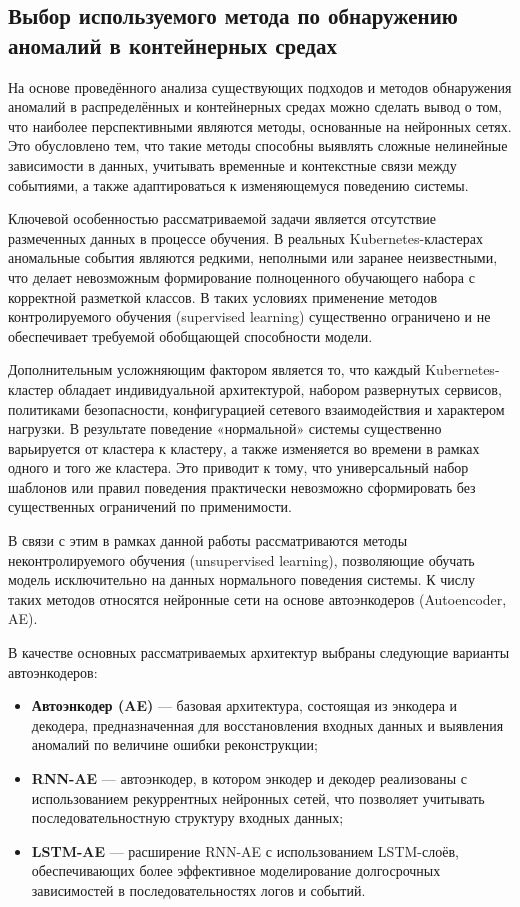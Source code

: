 \subsection{Выбор используемого метода по обнаружению аномалий в контейнерных средах}

На основе проведённого анализа существующих подходов и методов обнаружения аномалий в распределённых и контейнерных средах можно сделать вывод о том, что наиболее перспективными являются методы, основанные на нейронных сетях. Это обусловлено тем, что такие методы способны выявлять сложные нелинейные зависимости в данных, учитывать временные и контекстные связи между событиями, а также адаптироваться к изменяющемуся поведению системы.

Ключевой особенностью рассматриваемой задачи является отсутствие размеченных данных в процессе обучения. В реальных Kubernetes-кластерах аномальные события являются редкими, неполными или заранее неизвестными, что делает невозможным формирование полноценного обучающего набора с корректной разметкой классов. В таких условиях применение методов контролируемого обучения (supervised learning) существенно ограничено и не обеспечивает требуемой обобщающей способности модели.

Дополнительным усложняющим фактором является то, что каждый Kubernetes-кластер обладает индивидуальной архитектурой, набором развернутых сервисов, политиками безопасности, конфигурацией сетевого взаимодействия и характером нагрузки. В результате поведение «нормальной» системы существенно варьируется от кластера к кластеру, а также изменяется во времени в рамках одного и того же кластера. Это приводит к тому, что универсальный набор шаблонов или правил поведения практически невозможно сформировать без существенных ограничений по применимости.

В связи с этим в рамках данной работы рассматриваются методы неконтролируемого обучения (unsupervised learning), позволяющие обучать модель исключительно на данных нормального поведения системы. К числу таких методов относятся нейронные сети на основе автоэнкодеров (Autoencoder, AE).

В качестве основных рассматриваемых архитектур выбраны следующие варианты автоэнкодеров:

\begin{itemize}
    \item \textbf{Автоэнкодер (AE)} — базовая архитектура, состоящая из энкодера и декодера, предназначенная для восстановления входных данных и выявления аномалий по величине ошибки реконструкции;
    \item \textbf{RNN-AE} — автоэнкодер, в котором энкодер и декодер реализованы с использованием рекуррентных нейронных сетей, что позволяет учитывать последовательностную структуру входных данных;
    \item \textbf{LSTM-AE} — расширение RNN-AE с использованием LSTM-слоёв, обеспечивающих более эффективное моделирование долгосрочных зависимостей в последовательностях логов и событий.
\end{itemize}


